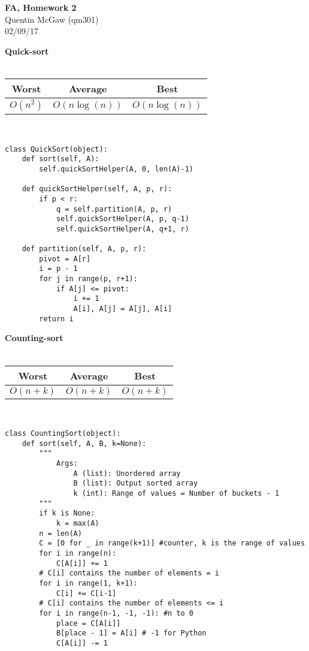 \documentclass[11pt]{article}
\begin{document}
\begin{center} {\Large\bf FA, Homework 2}  \\ Quentin McGaw (qm301) \\ 02/09/17
\end{center}

\textbf{Quick-sort} \\\\
\begin{tabular}{c|c|c}
    Worst & Average & Best \\
    \hline
    $O(n^2)$ & $O(n\log(n))$ & $O(n\log(n))$
\end{tabular}
\\
\begin{verbatim}
class QuickSort(object):
    def sort(self, A):
        self.quickSortHelper(A, 0, len(A)-1)

    def quickSortHelper(self, A, p, r):
        if p < r:
            q = self.partition(A, p, r)
            self.quickSortHelper(A, p, q-1)
            self.quickSortHelper(A, q+1, r)

    def partition(self, A, p, r):
        pivot = A[r]
        i = p - 1
        for j in range(p, r+1):
            if A[j] <= pivot:
                i += 1
                A[i], A[j] = A[j], A[i]
        return i
\end{verbatim}

\textbf{Counting-sort} \\\\
\begin{tabular}{c|c|c}
    Worst & Average & Best \\
    \hline
    $O(n+k)$ & $O(n+k)$ & $O(n+k)$
\end{tabular}
\\
\begin{verbatim}
class CountingSort(object):
    def sort(self, A, B, k=None):
        """
            Args:
                A (list): Unordered array
                B (list): Output sorted array
                k (int): Range of values = Number of buckets - 1
        """
        if k is None:
            k = max(A)
        n = len(A)
        C = [0 for _ in range(k+1)] #counter, k is the range of values
        for i in range(n):
            C[A[i]] += 1
        # C[i] contains the number of elements = i
        for i in range(1, k+1):
            C[i] += C[i-1] 
        # C[i] contains the number of elements <= i
        for i in range(n-1, -1, -1): #n to 0
            place = C[A[i]]
            B[place - 1] = A[i] # -1 for Python
            C[A[i]] -= 1
\end{verbatim}
\end{document}

